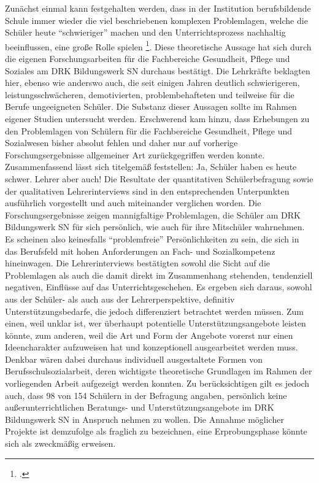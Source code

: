 Zunächst einmal kann festgehalten werden, dass in der Institution berufsbildende Schule immer wieder die viel beschriebenen komplexen Problemlagen, welche die Schüler heute "`schwieriger"' machen und den Unterrichtsprozess nachhaltig beeinflussen, eine große Rolle spielen \footcite[vgl.][1]{UniversitaetLeipzig2007}. Diese theoretische Aussage hat sich durch die eigenen Forschungsarbeiten für die Fachbereiche Gesundheit, Pflege und Soziales am DRK Bildungswerk SN durchaus bestätigt. Die Lehrkräfte beklagten hier, ebenso wie anderswo auch, die seit einigen Jahren deutlich schwierigeren, leistungsschwächeren, demotivierten, problembehafteten und teilweise für die Berufe ungeeigneten Schüler. Die Substanz dieser Aussagen sollte im Rahmen eigener Studien untersucht werden. Erschwerend kam hinzu, dass Erhebungen zu den Problemlagen von Schülern für die Fachbereiche Gesundheit, Pflege und Sozialwesen bisher absolut fehlen und daher nur auf vorherige Forschungsergebnisse allgemeiner Art zurückgegriffen werden konnte. Zusammenfassend lässt sich titelgemäß feststellen: Ja, Schüler haben es heute schwer. Lehrer aber auch! Die Resultate der quantitativen Schülerbefragung sowie der qualitativen Lehrerinterviews sind in den entsprechenden Unterpunkten ausführlich vorgestellt und auch miteinander verglichen worden. Die Forschungsergebnisse zeigen mannigfaltige Problemlagen, die Schüler am DRK Bildungswerk SN für sich persönlich, wie auch für ihre Mitschüler wahrnehmen. Es scheinen also keinesfalls "`problemfreie"' Persönlichkeiten zu sein, die sich in das Berufsfeld mit hohen Anforderungen an Fach- und Sozialkompetenz hineinwagen. Die Lehrerinterviews bestätigten sowohl die Sicht auf die Problemlagen als auch die damit direkt im Zusammenhang stehenden, tendenziell negativen, Einflüsse auf das Unterrichtsgeschehen. Es ergeben sich daraus, sowohl aus der Schüler- als auch aus der Lehrerperspektive, definitiv Unterstützungsbedarfe, die jedoch differenziert betrachtet werden müssen. Zum einen, weil unklar ist, wer überhaupt potentielle Unterstützungsangebote leisten könnte, zum anderen, weil die Art und Form der Angebote vorerst nur einen Ideencharakter aufzuweisen hat und konzeptionell ausgearbeitet werden muss. Denkbar wären dabei durchaus individuell ausgestaltete Formen von Berufsschulsozialarbeit, deren wichtigste theoretische Grundlagen im Rahmen der vorliegenden Arbeit aufgezeigt werden konnten. Zu berücksichtigen gilt es jedoch auch, dass 98 von 154 Schülern in der Befragung angaben, persönlich keine außerunterrichtlichen Beratungs- und Unterstützungsangebote im DRK Bildungswerk SN in Anspruch nehmen zu wollen. Die Annahme möglicher Projekte ist demzufolge als fraglich zu bezeichnen, eine Erprobungsphase könnte sich als zweckmäßig erweisen.


